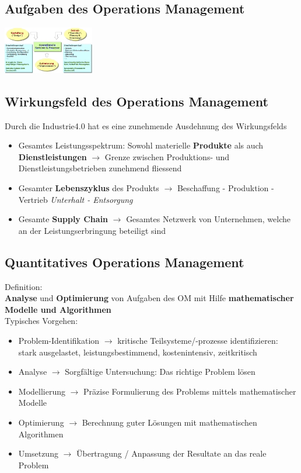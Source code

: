 \documentclass{report}
\newenvironment{Figure}
	{\par\medskip\noindent\minipage{\linewidth}}
	{\endminipage\par\medskip}
\theoremstyle{definition}
\theoremstyle{example}
\begin{document}
   \subsection{Aufgaben des Operations Management}
\begin{Figure}
\centering
\includegraphics[width=150px]{img/OMAufgaben.png}
	\label{fig:Die drei Aufgaben des OM}
\end{Figure}

   \subsection{Wirkungsfeld des Operations Management}
Durch die Industrie4.0 hat es eine zunehmende Ausdehnung des Wirkungsfelds
\begin{itemize}
   \item Gesamtes Leistungsspektrum: Sowohl materielle \textbf{Produkte} als auch \textbf{Dienstleistungen} $\rightarrow$ Grenze zwischen Produktions- und Dienstleistungsbetrieben zunehmend fliessend
   \item Gesamter \textbf{Lebenszyklus} des Produkts $\rightarrow$ Beschaffung - Produktion - Vertrieb \textit{Unterhalt - Entsorgung}
   \item Gesamte \textbf{Supply Chain} $\rightarrow$ Gesamtes Netzwerk von Unternehmen, welche an der Leistungserbringung beteiligt sind
\end{itemize}


   \subsection{Quantitatives Operations Management}
Definition:\\
\textbf{Analyse} und \textbf{Optimierung} von Aufgaben des OM mit Hilfe \textbf{mathematischer Modelle und Algorithmen}\\
Typisches Vorgehen:
\begin{itemize}
   \item Problem-Identifikation $\rightarrow$ kritische Teilsysteme/-prozesse identifizieren: stark ausgelastet, leistungsbestimmend, kostenintensiv, zeitkritisch
   \item Analyse $\rightarrow$ Sorgfältige Untersuchung: Das richtige Problem lösen
   \item Modellierung $\rightarrow$ Präzise Formulierung des Problems mittels mathematischer Modelle
   \item Optimierung $\rightarrow$ Berechnung guter Lösungen mit mathematischen Algorithmen
   \item Umsetzung $\rightarrow$ Übertragung / Anpassung der Resultate an das reale Problem
\end{itemize}
\end{document}
